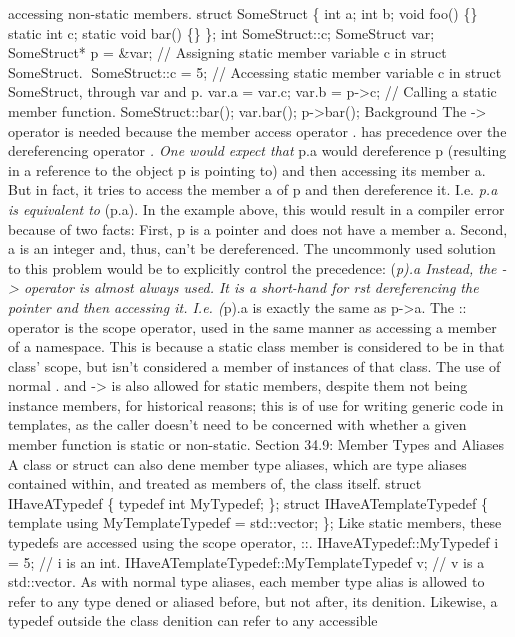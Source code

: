 accessing non-static members. struct SomeStruct \{ int a; int b; void
foo() \{\} static int c; static void bar() \{\} \}; int SomeStruct::c;
SomeStruct var; SomeStruct* p = \&var; // Assigning static member
variable c in struct SomeStruct. SomeStruct::c = 5; // Accessing static
member variable c in struct SomeStruct, through var and p. var.a =
var.c; var.b = p-\textgreater c; // Calling a static member function.
SomeStruct::bar(); var.bar(); p-\textgreater bar(); Background The
-\textgreater{} operator is needed because the member access operator .
has precedence over the dereferencing operator \emph{. One would expect
that }p.a would dereference p (resulting in a reference to the object p
is pointing to) and then accessing its member a. But in fact, it tries
to access the member a of p and then dereference it. I.e. \emph{p.a is
equivalent to }(p.a). In the example above, this would result in a
compiler error because of two facts: First, p is a pointer and does not
have a member a. Second, a is an integer and, thus, can't be
dereferenced. The uncommonly used solution to this problem would be to
explicitly control the precedence: (\emph{p).a Instead, the
-\textgreater{} operator is almost always used. It is a short-hand for
rst dereferencing the pointer and then accessing it. I.e. (}p).a is
exactly the same as p-\textgreater a. The :: operator is the scope
operator, used in the same manner as accessing a member of a namespace.
This is because a static class member is considered to be in that class'
scope, but isn't considered a member of instances of that class. The use
of normal . and -\textgreater{} is also allowed for static members,
despite them not being instance members, for historical reasons; this is
of use for writing generic code in templates, as the caller doesn't need
to be concerned with whether a given member function is static or
non-static. Section 34.9: Member Types and Aliases A class or struct can
also dene member type aliases, which are type aliases contained within,
and treated as members of, the class itself. struct IHaveATypedef \{
typedef int MyTypedef; \}; struct IHaveATemplateTypedef \{ template
using MyTemplateTypedef = std::vector; \}; Like static members, these
typedefs are accessed using the scope operator, ::.
IHaveATypedef::MyTypedef i = 5; // i is an int.
IHaveATemplateTypedef::MyTemplateTypedef v; // v is a std::vector. As
with normal type aliases, each member type alias is allowed to refer to
any type dened or aliased before, but not after, its denition. Likewise,
a typedef outside the class denition can refer to any accessible
